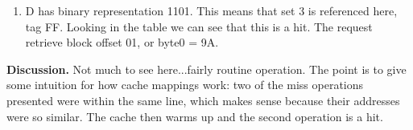 \documentclass{article}
\begin{document}
\begin{enumerate}[A.]
\begin{enumerate}
\item D has binary representation 1101. This means that set 3 is referenced here, tag FF. 
Looking in the table we can see that this is a hit. The request retrieve block offset 01, 
or byte0 = 9A.  

\end{enumerate}

\end{enumerate}

\bigskip

\noindent \textbf{Discussion.} Not much to see here...fairly routine operation. The point is
to give some intuition for how cache mappings work: two of the miss operations presented were
within the same line, which makes sense because their addresses were so similar. The cache then 
warms up and the second operation is a hit.  
\end{document}
